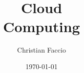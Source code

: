 \documentclass[a4paper,12pt]{report}
\institute{UniTs - University of Trieste}
\title{Cloud\\Computing}
\author{Christian Faccio}
\date{\today}
\begin{document}
\maketitle



\toc



\printbibliography
\end{document}
